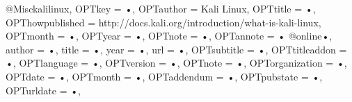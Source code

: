 @Misc{kalilinux,
OPTkey = {•},
OPTauthor = {Kali Linux},
OPTtitle = {•},
OPThowpublished = {http://docs.kali.org/introduction/what-is-kali-linux},
OPTmonth = {•},
OPTyear = {•},
OPTnote = {•},
OPTannote = {•}
}
@online{•,
author = {•},
title = {•},
year = {•},
url = {•},
OPTsubtitle = {•},
OPTtitleaddon = {•},
OPTlanguage = {•},
OPTversion = {•},
OPTnote = {•},
OPTorganization = {•},
OPTdate = {•},
OPTmonth = {•},
OPTaddendum = {•},
OPTpubstate = {•},
OPTurldate = {•},
}
